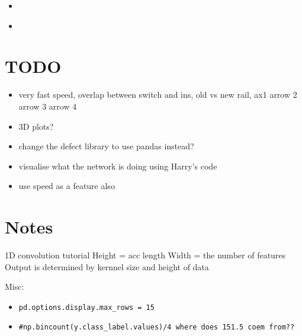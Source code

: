 \begin{itemize}
	\item
\end{itemize}

\begin{itemize}
	\item 
\end{itemize}


\newpage
\section{TODO}
\begin{itemize}
	\item very fast speed, overlap between switch and ins, old vs new rail, ax1 arrow 2 arrow 3 arrow 4
	\item 3D plots?
	\item change the defect library to use pandas instead?
	\item visualise what the network is doing using Harry's code
	\item use speed as a feature also
\end{itemize}


\newpage
\section{Notes}
1D convolution tutorial
Height = acc length
Width = the number of features
Output is determined by kernnel size and height of data

Misc:
\begin{itemize}
	\item \verb|pd.options.display.max_rows = 15|
	\item \verb|#np.bincount(y.class_label.values)/4 where does 151.5 coem from??|
\end{itemize}

